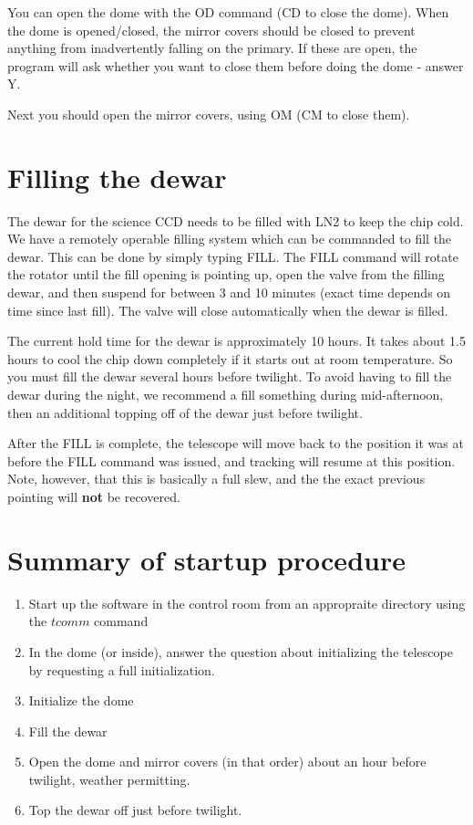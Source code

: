 \documentclass[10pt]{report}
\renewcommand{\[}{\begin{eqnarray}}
\renewcommand{\]}{\end{eqnarray}}
\begin{document}
You can open the dome with the OD command (CD to close the dome). When the
dome is opened/closed, the mirror covers should be closed to prevent anything
from inadvertently falling on the primary. If these are open, the program
will ask whether you want to close them before doing the dome - answer Y.

Next you should open the mirror covers, using OM (CM to close them).

\section{Filling the dewar}

The dewar for the science CCD needs to be filled with LN2 to keep the chip
cold. We have a remotely operable filling system which can be commanded
to fill the dewar. This can be done by simply typing FILL. The FILL 
command will rotate the rotator until the fill opening is pointing up,
open the valve from the filling dewar, and then suspend for between 3
and 10 minutes (exact time depends on time since last fill). The valve
will close automatically when the dewar is filled.

The current hold time for the dewar is approximately 10 hours. It takes
about 1.5 hours to cool the chip down completely if it starts out at
room temperature. So you must fill the dewar several hours before twilight.
To avoid having to fill the dewar during the night, we recommend a fill
something during mid-afternoon, then an additional topping off of the 
dewar just before twilight.

After the FILL is complete, the telescope will move back to the position
it was at before the FILL command was issued, and tracking will resume at
this position. Note, however, that this is basically a full slew, and the
the exact previous pointing will \textbf{not} be recovered.

\section{Summary of startup procedure}

\begin{enumerate}
\item Start up the software in the control room from an appropraite directory
using the $tcomm$ command

\item In the dome (or inside), answer the question about initializing the telescope
by requesting a full initialization.

\item Initialize the dome

\item Fill the dewar

\item Open the dome and mirror covers (in that order) about an hour before
twilight, weather permitting.

\item Top the dewar off just before twilight.

\end{enumerate}
\end{document}
